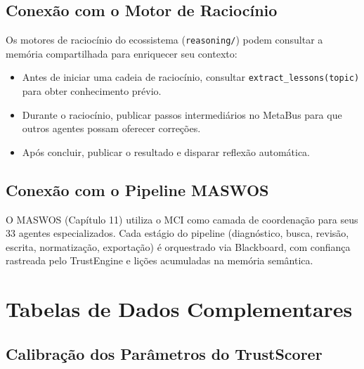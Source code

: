 \subsection{Conexão com o Motor de Raciocínio}

Os motores de raciocínio do ecossistema (\texttt{reasoning/}) podem consultar a memória compartilhada para enriquecer seu contexto:

\begin{itemize}
    \item Antes de iniciar uma cadeia de raciocínio, consultar \texttt{extract\_lessons(topic)} para obter conhecimento prévio.
    \item Durante o raciocínio, publicar passos intermediários no MetaBus para que outros agentes possam oferecer correções.
    \item Após concluir, publicar o resultado e disparar reflexão automática.
\end{itemize}

\subsection{Conexão com o Pipeline MASWOS}

O MASWOS (Capítulo 11) utiliza o MCI como camada de coordenação para seus 33 agentes especializados. Cada estágio do pipeline (diagnóstico, busca, revisão, escrita, normatização, exportação) é orquestrado via Blackboard, com confiança rastreada pelo TrustEngine e lições acumuladas na memória semântica.

\section{Tabelas de Dados Complementares}
\label{sec:complementary-tables}

\subsection{Calibração dos Parâmetros do TrustScorer}

